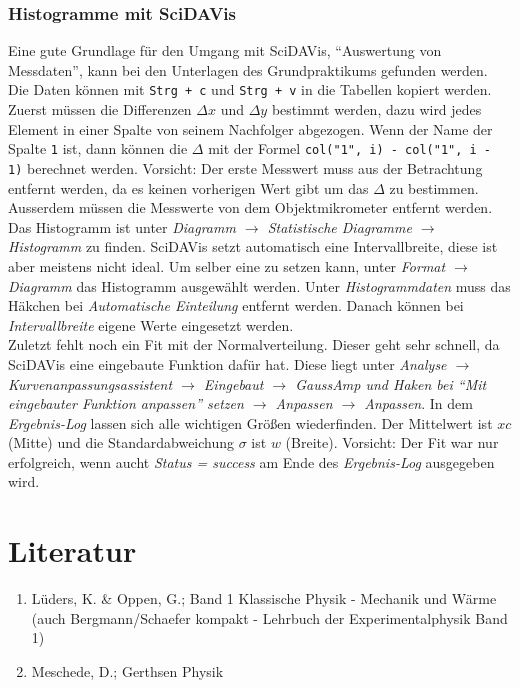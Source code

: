 \subsubsection*{Histogramme mit SciDAVis}
Eine gute Grundlage für den Umgang mit SciDAVis, ``Auswertung von Messdaten'', kann bei den Unterlagen des Grundpraktikums gefunden werden.\\
Die Daten können mit \verb|Strg + c| und \verb|Strg + v|  in die Tabellen kopiert werden. Zuerst müssen die Differenzen $\Delta x$ und $\Delta y$ bestimmt werden, dazu wird jedes Element in einer Spalte von seinem Nachfolger abgezogen. Wenn der Name der Spalte \verb|1|  ist, dann können die $\Delta$ mit der Formel \verb|col("1", i) - col("1", i - 1)| berechnet werden. Vorsicht: Der erste Messwert muss aus der Betrachtung entfernt werden, da es keinen vorherigen Wert gibt um das $\Delta$ zu bestimmen. Ausserdem müssen die Messwerte von dem Objektmikrometer entfernt werden.\\
Das Histogramm ist unter \emph{Diagramm $\rightarrow$ Statistische Diagramme $\rightarrow$ Histogramm} zu finden. SciDAVis setzt automatisch eine Intervallbreite, diese ist aber meistens nicht ideal. Um selber eine zu setzen kann, unter \emph{Format $\rightarrow$ Diagramm} das Histogramm ausgewählt werden. Unter \emph{Histogrammdaten} muss das Häkchen bei \emph{Automatische Einteilung} entfernt werden. Danach können bei \emph{Intervallbreite} eigene Werte eingesetzt werden.\\
Zuletzt fehlt noch ein Fit mit der Normalverteilung. Dieser geht sehr schnell, da SciDAVis eine eingebaute Funktion dafür hat. Diese liegt unter \emph{Analyse $\rightarrow$ Kurvenanpassungsassistent $\rightarrow$ Eingebaut $\rightarrow$ GaussAmp und Haken bei ``Mit eingebauter Funktion anpassen'' setzen $\rightarrow$ Anpassen $\rightarrow$ Anpassen}. In dem \emph{Ergebnis-Log} lassen sich alle wichtigen Größen wiederfinden. Der Mittelwert ist $xc$ (Mitte) und die Standardabweichung $\sigma$ ist $w$ (Breite). Vorsicht: Der Fit war nur erfolgreich, wenn aucht \emph{Status = success} am Ende des \emph{Ergebnis-Log} ausgegeben wird.


\section*{Literatur}

\begin{enumerate}

  \item Lüders, K. \& Oppen, G.; Band 1 Klassische Physik - Mechanik und Wärme\\ (auch Bergmann/Schaefer kompakt - Lehrbuch der Experimentalphysik Band 1) \label{it:bergmann}

  \item Meschede, D.; Gerthsen Physik

\end{enumerate}
